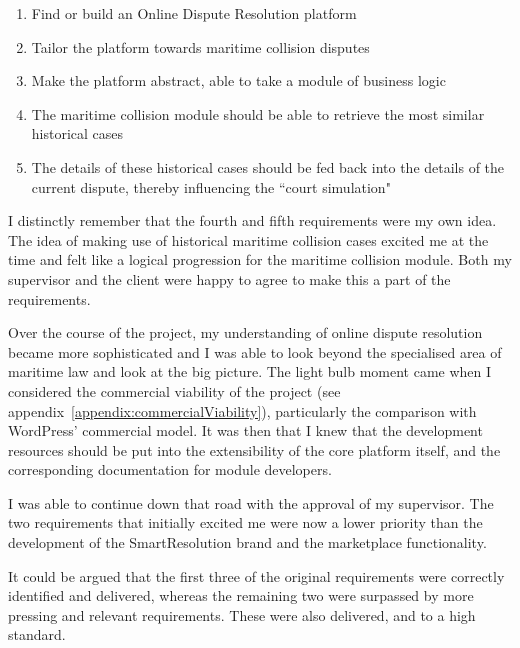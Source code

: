 \begin{enumerate}

    \item Find or build an Online Dispute Resolution platform
    
    \item Tailor the platform towards maritime collision disputes

    \item Make the platform abstract, able to take a module of business logic
    
    \item The maritime collision module should be able to retrieve the most similar historical cases

    \item The details of these historical cases should be fed back into the details of the current dispute, thereby influencing the ``court simulation"

\end{enumerate}

I distinctly remember that the fourth and fifth requirements were my own idea. The idea of making use of historical maritime collision cases excited me at the time and felt like a logical progression for the maritime collision module. Both my supervisor and the client were happy to agree to make this a part of the requirements.

Over the course of the project, my understanding of online dispute resolution became more sophisticated and I was able to look beyond the specialised area of maritime law and look at the big picture. The light bulb moment came when I considered the commercial viability of the project (see appendix~\ref{appendix:commercialViability}), particularly the comparison with WordPress' commercial model. It was then that I knew that the development resources should be put into the extensibility of the core platform itself, and the corresponding documentation for module developers.

I was able to continue down that road with the approval of my supervisor. The two requirements that initially excited me were now a lower priority than the development of the SmartResolution brand and the marketplace functionality.

It could be argued that the first three of the original requirements were correctly identified and delivered, whereas the remaining two were surpassed by more pressing and relevant requirements. These were also delivered, and to a high standard.

